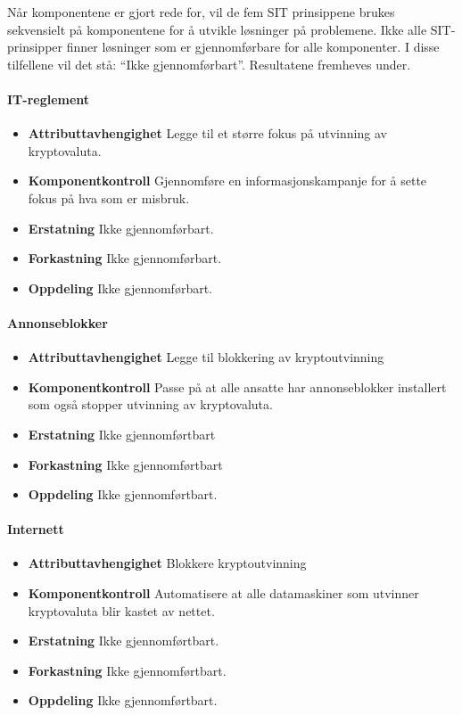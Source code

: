 Når komponentene er gjort rede for, vil de fem SIT prinsippene brukes sekvensielt på komponentene for å utvikle løsninger på problemene. Ikke alle SIT-prinsipper finner løsninger som er gjennomførbare for alle komponenter. I disse tilfellene vil det stå: ``Ikke gjennomførbart''. Resultatene fremheves under.

\paragraph{IT-reglement}
\begin{itemize}
    \item \textbf{Attributtavhengighet} Legge til et større fokus på utvinning av kryptovaluta.
    \item \textbf{Komponentkontroll} Gjennomføre en informasjonskampanje for å sette fokus på hva som er misbruk.
    \item \textbf{Erstatning} Ikke gjennomførbart.
    \item \textbf{Forkastning} Ikke gjennomførbart.
    \item \textbf{Oppdeling} Ikke gjennomførbart. 
\end{itemize}

\paragraph{Annonseblokker}
\begin{itemize}
    \item \textbf{Attributtavhengighet} Legge til blokkering av kryptoutvinning 
    \item \textbf{Komponentkontroll} Passe på at alle ansatte har annonseblokker installert som også stopper utvinning av kryptovaluta.
    \item \textbf{Erstatning} Ikke gjennomførtbart
    \item \textbf{Forkastning} Ikke gjennomførtbart
    \item \textbf{Oppdeling} Ikke gjennomførtbart.
\end{itemize}

\paragraph{Internett}
\begin{itemize}
    \item \textbf{Attributtavhengighet} Blokkere kryptoutvinning
    \item \textbf{Komponentkontroll} Automatisere at alle datamaskiner som utvinner kryptovaluta blir kastet av nettet.
    \item \textbf{Erstatning} Ikke gjennomførtbart.
    \item \textbf{Forkastning} Ikke gjennomførtbart.
    \item \textbf{Oppdeling} Ikke gjennomførtbart.
\end{itemize}


